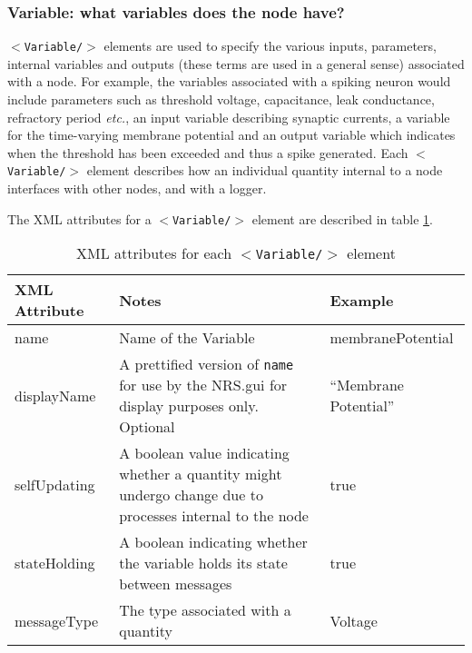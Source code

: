 \documentclass[pdftex,a4paper]{article}
\newcommand{\etc}{{\it etc.}}
\newcommand{\XML}[2][]{{\tt \small $<$#2#1/$>$}}
\newcommand{\XMLfont}[1]{{\tt \small #1}}
\begin{document}
\subsubsection{Variable: what variables does the node have?}
\label{sec:variables}

\XML{Variable} elements are used to specify the various inputs,
parameters, internal variables and outputs (these terms are used in a
general sense) associated with a node. For example, the variables
associated with a spiking neuron would include parameters such as
threshold voltage, capacitance, leak conductance, refractory period
\etc, an input variable describing synaptic currents, a variable for the
time-varying membrane potential and an output variable which indicates
when the threshold has been exceeded and thus a spike generated. Each
\XML{Variable} element describes how an individual quantity internal to
a node interfaces with other nodes, and with a logger.

The XML attributes for a \XML{Variable} element are described in table
\ref{tab:variables}.

\begin{table}[!h]
  \begin{center}
    \caption{XML attributes for each \XML{Variable} element}
    \label{tab:variables}
    \begin{tabular}{|l|p{6cm}|l|}
      \hline

      \textbf{XML Attribute} & \textbf{Notes} & \textbf{Example}\\

      \hline

      name & Name of the Variable & membranePotential\\

      \hline

      displayName & A prettified version of \XMLfont{name} for use by
      the NRS.gui for display purposes only. Optional & ``Membrane
      Potential'' \\

      \hline

      selfUpdating & A boolean value indicating whether a quantity might
      undergo change due to processes internal to the node & true \\

      \hline

      stateHolding & A boolean indicating whether the variable holds
      its state between messages & true \\

      \hline

      messageType & The type associated with a quantity & Voltage\\

      \hline
    \end{tabular}
  \end{center}
\end{table}
\end{document}
